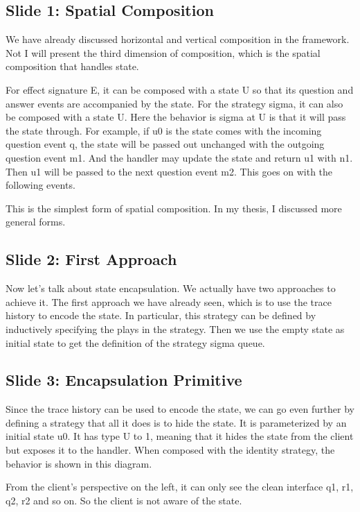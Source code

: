 \documentclass{article}
\begin{document}
\subsection{Slide 1: Spatial Composition}

We have already discussed horizontal and vertical composition in the framework.
Not I will present the third dimension of composition, which is the spatial
composition that handles state.

For effect signature E, it can be composed with a state U so that its question
and answer events are accompanied by the state. For the strategy sigma, it can
also be composed with a state U. Here the behavior is sigma at U is that it will
pass the state through. For example, if u0 is the state comes with the incoming
question event q, the state will be passed out unchanged with the outgoing
question event m1. And the handler may update the state and return u1 with n1.
Then u1 will be passed to the next question event m2. This goes on with the
following events.

This is the simplest form of spatial composition. In my thesis, I discussed more
general forms.

\subsection{Slide 2: First Approach}

Now let's talk about state encapsulation. We actually have two approaches to
achieve it. The first approach we have already seen, which is to use the trace
history to encode the state. In particular, this strategy can be defined by
inductively specifying the plays in the strategy. Then we use the empty state as
initial state to get the definition of the strategy sigma queue.

\subsection{Slide 3: Encapsulation Primitive}

Since the trace history can be used to encode the state, we can go even further
by defining a strategy that all it does is to hide the state. It is
parameterized by an initial state u0. It has type U to 1, meaning that it hides
the state from the client but exposes it to the handler. When composed with the
identity strategy, the behavior is shown in this diagram.

From the client's perspective on the left, it can only see the clean interface
q1, r1, q2, r2 and so on. So the client is not aware of the state.
\end{document}
